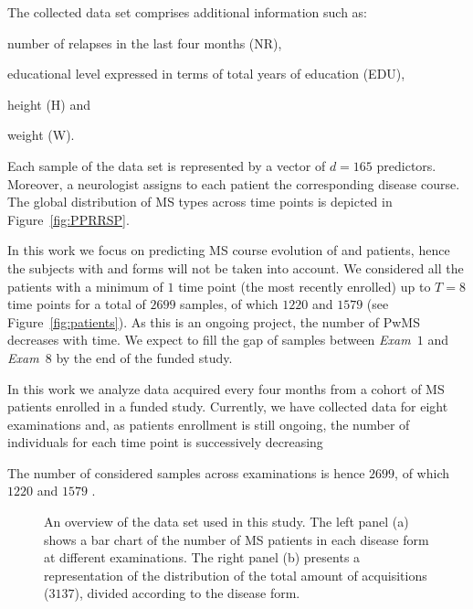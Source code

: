 The collected \PCO data set comprises additional information such as:
\begin{enumerate*}[label=\roman*)]
	\item number of relapses in the last four months (NR),
	\item educational level expressed in terms of total years of education (EDU),
	\item height (H) and
	\item weight (W).
\end{enumerate*}
Each sample of the data set is represented by a vector of $d=165$ predictors.
Moreover, a neurologist assigns to each patient the corresponding disease course. The global distribution of MS types across time points is depicted in Figure~\ref{fig:PPRRSP}.



In this work we focus on predicting MS course evolution of  \RR and  \SP patients, hence the subjects with \PR and \PP forms will not be taken into account.
We considered all the patients with a minimum of $1$ time point (the most recently enrolled) up to $T=8$ time points for a total of $2699$ samples, of which $1220$ \RR and $1579$ \SP (see Figure~\ref{fig:patients}). As this is an ongoing project, the number of PwMS decreases with time. We expect to fill the gap of samples between \textit{Exam~$1$} and \textit{Exam~$8$} by the end of the funded study.

 In this work we analyze \PCOs data acquired every four months from a cohort of MS patients enrolled in a funded study.
 Currently, we have collected data for eight examinations and, as patients enrollment is still ongoing,  the number of individuals for each time point is successively decreasing

 The number of considered samples across examinations is hence $2699$, of which $1220$ \RR and $1579$ \SP.

 \begin{figure}[h!]
	\centering
	\hfill%
	\caption{An overview of the \PCO data set used in this study. The left panel (a) shows a bar chart of the number of MS patients in each disease form  at different examinations. The right panel (b) presents a representation of the distribution of the total amount of acquisitions ($3137$), divided according to the disease form. }\label{fig:data}
\end{figure}



